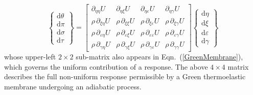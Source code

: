 \begin{equation}
\label{energies2D}
\left\{ \begin{matrix}
\mathrm{d} \theta \\ \mathrm{d} \pi \\
\mathrm{d} \sigma \\ \mathrm{d} \tau
\end{matrix} \right\} = \begin{bmatrix}
\partial_{\eta\eta} U & 
\partial_{\eta\xi} U & 
\partial_{\eta\varepsilon} U & 
\partial_{\eta\gamma} U \\ 
\rho \, \partial_{\xi\eta} U & 
\rho \, \partial_{\xi\xi} U & 
\rho \, \partial_{\xi\varepsilon} U &
\rho \, \partial_{\xi\gamma} U \\
\rho \, \partial_{\varepsilon\eta} U & 
\rho \, \partial_{\varepsilon\xi} U & 
\rho \, \partial_{\varepsilon\varepsilon} U & 
\rho \, \partial_{\varepsilon\gamma} U \\
\rho \, \partial_{\gamma\eta} U & 
\rho \, \partial_{\gamma\xi} U & 
\rho \, \partial_{\gamma\varepsilon} U & 
\rho \, \partial_{\gamma\gamma} U 
\end{bmatrix} 
\left\{ \begin{matrix}
\mathrm{d}\eta \\ \mathrm{d} \xi \\
\mathrm{d} \varepsilon \\ \mathrm{d} \gamma
\end{matrix} \right\}  
\end{equation}
whose upper-left $2\times 2$ sub-matrix also appears in Eqn.~(\ref{GreenMembrane}), which governs the uniform contribution of a response.  The above $4 \times 4$ matrix describes the full non-uniform response permissible by a Green thermo\-elastic membrane undergoing an adiabatic process.

